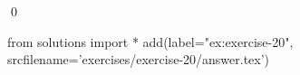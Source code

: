 
\begin{ex} 
  \label{ex:exercise-20}
  
  \qed
\end{ex} 
\begin{python0}
from solutions import *
add(label="ex:exercise-20",
    srcfilename='exercises/exercise-20/answer.tex') 
\end{python0}
